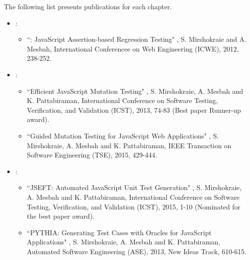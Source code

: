 The following list presents publications for each chapter.
\begin{itemize}
\item {}:
\begin{itemize}
\item ``\jsart: JavaScript Assertion-based Regression Testing" \cite{mirshokraie:icwe12},
S. Mirshokraie and A. Mesbah, International Conferencee on Web Engineering (ICWE), 2012, 238-252.
\end{itemize}
\item {}:
\begin{itemize}
\item ``Efficient JavaScript Mutation Testing" \cite{mirshokraie:icst13},
S. Mirshokraie, A. Mesbah and K. Pattabiraman, International Conference on Software Testing, Verification, and Validation (ICST), 2013, 74-83 (Best paper Runner-up award).
\item ``Guided Mutation Testing for JavaScript Web Applications" \cite{mirshokraie:tse15},
S. Mirshokraie, A. Mesbah and K. Pattabiraman, IEEE Transaction on Software Engineering (TSE), 2015, 429-444.
\end{itemize}
\item {}:
\begin{itemize}
\item ``JSEFT: Automated JavaScript Unit Test Generation" \cite{mirshokraie:icst15},
S. Mirshokraie, A. Mesbah and K. Pattabiraman, International Conference on Software Testing, Verification, and Validation (ICST), 2015, 1-10 (Nominated for the best paper award).
\item ``PY\-THIA: Generating Test Cases with Oracles
for JavaScript Applications" \cite{shabnam:ase13},
S. Mirshokraie, A. Mesbah and K. Pattabiraman, Automated Software Engineering (ASE), 2013, New Ideas Track, 610-615.
\end{itemize} 
\end{itemize}

